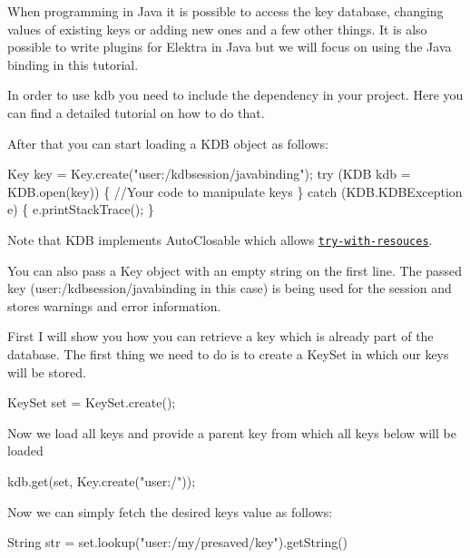 When programming in Java it is possible to access the key database, changing values of existing keys or adding new ones and a few other things. It is also possible to write plugins for Elektra in Java but we will focus on using the Java binding in this tutorial.

In order to use {\ttfamily kdb} you need to include the dependency in your project. Here you can find a detailed tutorial on how to do that.

After that you can start loading a {\ttfamily K\+DB} object as follows\+:


\begin{DoxyCode}
Key key = Key.create(\textcolor{stringliteral}{"user:/kdbsession/javabinding"});
\textcolor{keywordflow}{try} (KDB kdb = KDB.open(key)) \{
    \textcolor{comment}{//Your code to manipulate keys}
\} \textcolor{keywordflow}{catch} (KDB.KDBException e) \{
    e.printStackTrace();
\}
\end{DoxyCode}


Note that {\ttfamily K\+DB} implements {\ttfamily Auto\+Closable} which allows \href{https://docs.oracle.com/javase/tutorial/essential/exceptions/tryResourceClose.html}{\tt try-\/with-\/resouces}.

You can also pass a {\ttfamily Key} object with an empty string on the first line. The passed key ({\ttfamily user\+:/kdbsession/javabinding} in this case) is being used for the session and stores warnings and error information.

First I will show you how you can retrieve a key which is already part of the database. The first thing we need to do is to create a {\ttfamily Key\+Set} in which our keys will be stored.


\begin{DoxyCode}
KeySet \textcolor{keyword}{set} = KeySet.create();
\end{DoxyCode}


Now we load all keys and provide a parent key from which all keys below will be loaded


\begin{DoxyCode}
kdb.get(\textcolor{keyword}{set}, Key.create(\textcolor{stringliteral}{"user:/"}));
\end{DoxyCode}


Now we can simply fetch the desired key\textquotesingle{}s value as follows\+:


\begin{DoxyCode}
String str = \textcolor{keyword}{set}.lookup(\textcolor{stringliteral}{"user:/my/presaved/key"}).getString()
\end{DoxyCode}


